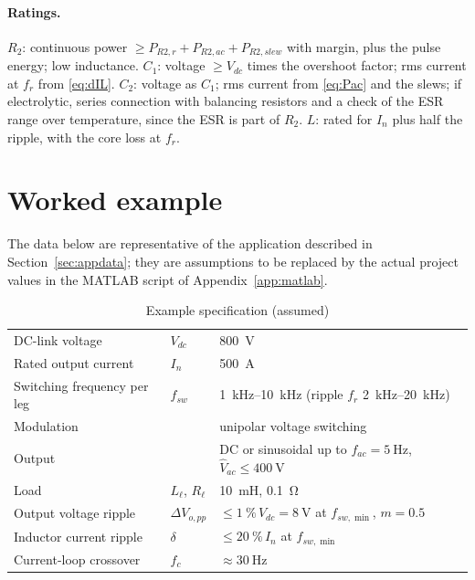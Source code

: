 \documentclass[11pt,a4paper]{article}
\begin{document}
\paragraph{Ratings.} $R_2$: continuous power $\ge P_{R2,r} + P_{R2,ac} + P_{R2,slew}$
with margin, plus the pulse energy; low inductance. $C_1$: voltage $\ge V_{dc}$ times
the overshoot factor; rms current at $f_r$ from \eqref{eq:dIL}. $C_2$: voltage as $C_1$;
rms current from \eqref{eq:Pac} and the slews; if electrolytic, series connection with
balancing resistors and a check of the ESR range over temperature, since the ESR is part
of $R_2$. $L$: rated for $I_n$ plus half the ripple, with the core loss at $f_r$.

\section{Worked example}
\label{sec:example}

The data below are representative of the application described in
Section~\ref{sec:appdata}; they are assumptions to be replaced by the actual project
values in the MATLAB script of Appendix~\ref{app:matlab}.

\begin{table}[htb]
\centering
\small
\caption{Example specification (assumed)}
\begin{tabular}{@{}lll@{}}
\toprule
DC-link voltage & $V_{dc}$ & \SI{800}{\volt} \\
Rated output current & $I_n$ & \SI{500}{\ampere} \\
Switching frequency per leg & $f_{sw}$ & \SIrange{1}{10}{\kilo\hertz} (ripple $f_r$ \SIrange{2}{20}{\kilo\hertz}) \\
Modulation & & unipolar voltage switching \\
Output & & DC or sinusoidal up to $f_{ac} = \SI{5}{\hertz}$, $\hat V_{ac} \le \SI{400}{\volt}$ \\
Load & $L_\ell$, $R_\ell$ & \SI{10}{\milli\henry}, \SI{0.1}{\ohm} \\
Output voltage ripple & $\Delta V_{o,pp}$ & $\le \SI{1}{\percent}\,V_{dc} = \SI{8}{\volt}$ at $f_{sw,\min}$, $m = 0.5$ \\
Inductor current ripple & $\delta$ & $\le \SI{20}{\percent}\,I_n$ at $f_{sw,\min}$ \\
Current-loop crossover & $f_c$ & $\approx \SI{30}{\hertz}$ \\
\bottomrule
\end{tabular}
\label{tab:spec}
\end{table}
\end{document}
